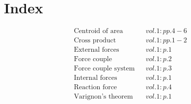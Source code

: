 \documentclass[a4paper]{article}
\begin{document}
 
\section*{Index} 
\begin{align*} 
&\text{Centroid of area}&& vol. 1: pp. 4-6\\
&\text{Cross product}&& vol. 1: pp. 1-2\\
&\text{External forces}&& vol. 1: p. 1\\
&\text{Force couple}&& vol. 1: p. 2\\
&\text{Force couple system}&& vol. 1: p. 3\\
&\text{Internal forces}&& vol. 1: p. 1\\
&\text{Reaction force}&& vol. 1: p. 4\\
&\text{Varignon's theorem}&& vol. 1: p. 1\\
\end{align*} 
\end{document}
